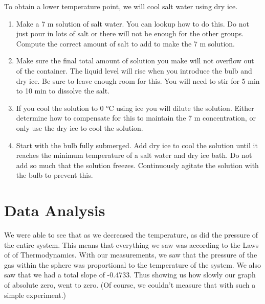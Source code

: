 \documentclass[12pt]{report}
\begin{document}
	To obtain a lower temperature point, we will cool salt water using dry ice.
	\begin{enumerate}
		\item Make a 7 m solution of salt water. You can lookup how to do this. Do not just pour in lots of salt or there will not be enough for the other groups. Compute the correct amount of salt to add to make the 7 m solution.
		\item Make sure the final total amount of solution you make will not overflow out of the container. The liquid level will rise when you introduce the bulb and dry ice. Be sure to leave enough room for this. You will need to stir for 5 min to 10 min to dissolve the salt.
		\item If you cool the solution to 0 °C using ice you will dilute the solution. Either determine how to compensate for this to maintain the 7 m concentration, or only use the dry ice to cool the solution.
		\item Start with the bulb fully submerged. Add dry ice to cool the solution until it reaches the minimum temperature of a salt water and dry ice bath. Do not add so much that the solution freezes. Continuously agitate the solution with the bulb to prevent this.
	\end{enumerate}
\section{Data Analysis}
	
	We were able to see that as we decreased the temperature, as did the pressure of the entire system. This means that everything  we saw was according to the Laws of of Thermodynamics. With our measurements, we saw that the pressure of the gas within the sphere was proportional to the temperature of the system. We also saw that we had a total slope of -0.4733. Thus showing us how slowly our graph of absolute zero, went to zero. (Of course, we couldn't measure that with such a simple experiment.)
\end{document}

